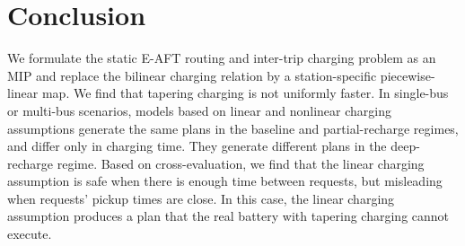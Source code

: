 \documentclass[11pt]{article}
\begin{document}
\section{Conclusion}

We formulate the static E-AFT routing and inter-trip charging problem as an MIP and replace the bilinear charging relation by a station-specific piecewise-linear map. We find that tapering charging is not uniformly faster. In single-bus or multi-bus scenarios, models based on linear and nonlinear charging assumptions generate the same plans in the baseline and partial-recharge regimes, and differ only in charging time. They generate different plans in the deep-recharge regime. Based on cross-evaluation, we find that the linear charging assumption is safe when there is enough time between requests, but misleading when requests' pickup times are close. In this case, the linear charging assumption produces a plan that the real battery with tapering charging cannot execute.




\end{document}

